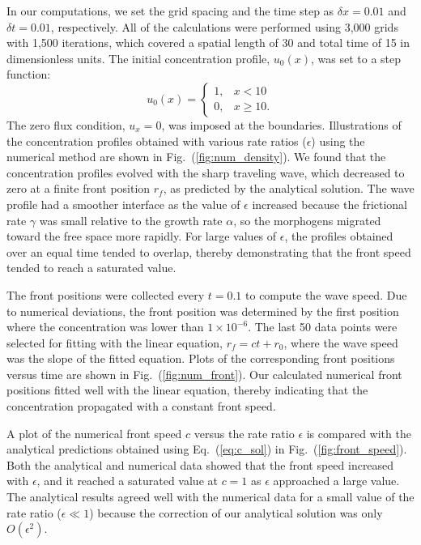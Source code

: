 \documentclass[jkps,preprint,fleqn,showpacs,showkeys]{revtex4}
\newcommand{\Fig}[1]{Fig.~(\ref{#1})}
\newcommand{\eq}[1]{Eq.~(\ref{#1})}
\newcommand{\Order}[1]{O(#1)}
\begin{document}
In our computations, we set the grid spacing and the time step as $\delta x = 0.01$ and $\delta t = 0.01$, respectively. All of the calculations were performed using 3,000 grids with 1,500 iterations, which covered a spatial length of 30 and total time of 15 in dimensionless units. The initial concentration profile, $u_0(x)$, was set to a step function:
\begin{equation}\label{eq:step_fn}
u_0(x) = \left\{ 
\begin{array}{lc} 
1, & x < 10 \\ 
0, & x \geq 10.
\end{array} \right.
\end{equation}
The zero flux condition, $u_x=0$, was imposed at the boundaries. Illustrations of the concentration profiles obtained with various rate ratios ($\epsilon$) using the numerical method are shown in \Fig{fig:num_density}. We found that the concentration profiles evolved with the sharp traveling wave, which decreased to zero at a finite front position $r_f$, as predicted by the analytical solution. The wave profile had a smoother interface as the value of $\epsilon$ increased because the frictional rate $\gamma$ was small relative to the growth rate $\alpha$, so the morphogens migrated toward the free space more rapidly. For large values of $\epsilon$, the profiles obtained over an equal time tended to overlap, thereby demonstrating that the front speed tended to reach a saturated value. 

The front positions were collected every $t=0.1$ to compute the wave speed. Due to numerical deviations, the front position was determined by the first position where the concentration was lower than $1\times 10^{-6}$. The last 50 data points were selected for fitting with the linear equation, $r_f = ct + r_0$, where the wave speed was the slope of the fitted equation. Plots of the corresponding front positions versus time are shown in \Fig{fig:num_front}. Our calculated numerical front positions fitted well with the linear equation, thereby indicating that the concentration propagated with a constant front speed. 

A plot of the numerical front speed $c$ versus the rate ratio $\epsilon$ is compared with the analytical predictions obtained using \eq{eq:c_sol} in \Fig{fig:front_speed}. Both the analytical and numerical data showed that the front speed increased with $\epsilon$, and it reached a saturated value at $c=1$ as $\epsilon$ approached a large value. The analytical results agreed well with the numerical data for a small value of the rate ratio ($\epsilon \ll 1$) because the correction of our analytical solution was only $\Order{\epsilon^2}$. 
\end{document}
